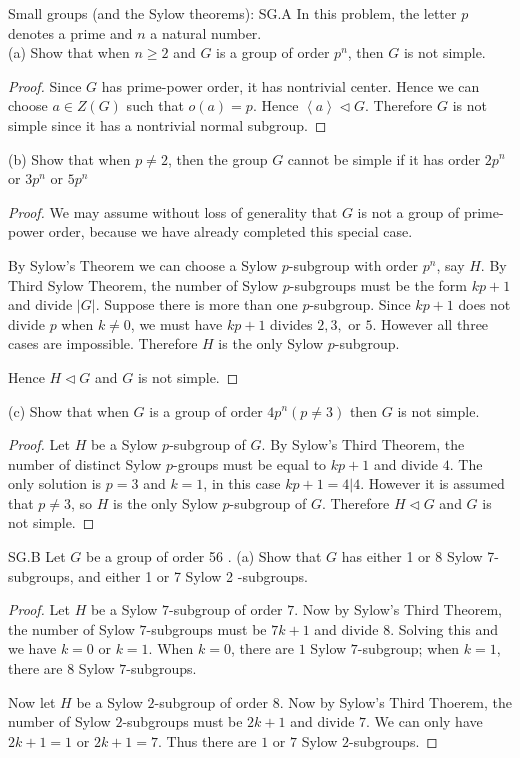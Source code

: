 Small groups (and the Sylow theorems):
SG.A In this problem, the letter $p$ denotes a prime and $n$ a natural number.\\
(a) Show that when $n \geq 2$ and $G$ is a group of order $p^n$, then $G$ is not simple.
\begin{proof}
	Since $G$ has prime-power order, it has nontrivial center. Hence we can choose $a \in Z(G)$ such that $o(a) = p$. Hence  $\left\langle a \right\rangle \triangleleft G$. Therefore  $G$ is not simple since it has a nontrivial normal subgroup.
\end{proof}

(b) Show that when $p \neq 2$, then the group $G$ cannot be simple if it has order $2 p^n$ or $3 p^n$ or $5 p^n$
\begin{proof}
	We may assume without loss of generality that  $G$ is not a group of prime-power order, because we have already completed this special case.

	By Sylow's Theorem we can choose a Sylow  $p$-subgroup with order $p^n$, say $H$. By Third Sylow Theorem, the number of Sylow $p$-subgroups must be the form $kp+1$ and divide $|G|$. Suppose there is more than one $p$-subgroup. Since $kp+1$ does not divide $p$ when $k\neq 0$, we must have $kp+1$ divides $2, 3, $ or $5$. However all three cases are impossible. Therefore $H$ is the only Sylow $p$-subgroup.

	Hence $H \triangleleft G$ and $G$ is not simple.
\end{proof}

(c) Show that when $G$ is a group of order $4 p^n(p \neq 3)$ then $G$ is not simple.
\begin{proof}
	Let $H$ be a Sylow $p$-subgroup of $G$. By Sylow's Third Theorem, the number of distinct Sylow $p$-groups must be equal to $kp+1$ and divide $4$. The only solution is $p = 3$ and $k =1$, in this case $kp+1 = 4 | 4$. However it is assumed that $p\neq 3$, so $H$ is the only Sylow $p$-subgroup of $G$. Therefore $H \triangleleft G$ and $G$ is not simple.
\end{proof}

SG.B Let $G$ be a group of order 56 .
(a) Show that $G$ has either 1 or 8 Sylow 7-subgroups, and either 1 or 7 Sylow 2 -subgroups.
\begin{proof}
	Let $H$ be a Sylow $7$-subgroup of order $7$. Now by Sylow's Third Theorem, the number of Sylow $7$-subgroups must be $7k+1$ and divide $8$. Solving this and we have $k = 0$ or $k = 1$. When $k=0$, there are $1$ Sylow $7$-subgroup; when  $k=1$, there are $8$ Sylow $7$-subgroups.

	Now let $H$ be a Sylow $2$-subgroup of order $8$. Now by Sylow's Third Thoerem, the number of Sylow $2$-subgroups must be $2k+1 $ and divide $7$. We can only have $2k+1 = 1$ or $2k+1 = 7$. Thus there are $1 $ or $7$ Sylow $2$-subgroups.
\end{proof}


